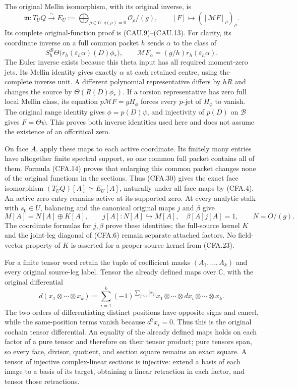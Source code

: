 The original Mellin isomorphism, with its original inverse, is
\[
 \mathfrak m:T_UQ\xrightarrow{\sim}
 E_U:=\bigoplus_{\rho\in U:g(\rho)=0}\mathcal O_\rho/(g),
 \qquad[F]\mapsto([\mathcal MF]_\rho)_\rho.                  \tag{CFA.30}
\]
Its complete original-function proof is (CAU.9)--(CAU.13).
For clarity, its coordinate inverse on a full common packet $h$
sends $\alpha$ to the class of
\[
 S_h^{\mathscr B}\Theta\bigl(r_h(\varepsilon_h\alpha)(D)\phi_*\bigr),
 \qquad\mathcal M F_\alpha=(g/h)r_h(\varepsilon_h\alpha).
                                                               \tag{CFA.31}
\]
The Euler inverse exists because this theta input has all required
moment-zero jets.  Its Mellin identity gives exactly $\alpha$ at
each retained centre, using the complete inverse unit.  A different
polynomial representative differs by $hR$ and changes the source
by $\Theta(R(D)\phi_*)$.  If a torsion representative has zero
full local Mellin class, its equation $p\mathcal MF=gH_\phi$
forces every $p$-jet of $H_\phi$ to vanish.  The original range
identity gives $\phi=p(D)\psi$, and injectivity of $p(D)$ on
$\mathscr B$ gives $F=\Theta\psi$.  This proves both inverse
identities used here and does not assume the existence of an offcritical
zero.

On face $A$, apply these maps to each active coordinate.  Its finitely
many entries have altogether finite spectral support, so one common
full packet contains all of them.  Formula (CFA.14) proves that enlarging
this common packet changes none of the original functions in the
sections.  Thus (CFA.30) gives the exact face isomorphism
$(T_UQ)[A]\simeq E_U[A]$, naturally under all face maps by (CFA.4).
An active zero entry remains active at its supported zero.
At every analytic stalk with $s_0\in U$, balancing and the canonical original maps
$j$ and $\beta$ give
\[
 M[A]=N[A]\oplus K[A],\qquad
 j[A]:N[A]\hookrightarrow M[A],\quad
 \beta[A]j[A]=1,\qquad N=O/(g).                              \tag{CFA.32}
\]
The coordinate formulas for $j,\beta$ prove these identities; the
full-source kernel $K$ and the joint-leg diagonal of (CFA.6) remain
separate attached factors.  No field-vector property of $K$ is
asserted for a proper-source kernel from (CFA.23).

For a finite tensor word retain the tuple of coefficient masks
$(A_1,\ldots,A_k)$ and every original source-leg label.  Tensor the
already defined maps over $\mathbb C$, with the original differential
\[
 d(x_1\otimes\cdots\otimes x_k)
 =\sum_{i=1}^k(-1)^{\sum_{j<i}|x_j|}
       x_1\otimes\cdots\otimes dx_i\otimes\cdots\otimes x_k.
                                                               \tag{CFA.33}
\]
The two orders of differentiating distinct positions have opposite
signs and cancel, while the same-position terms vanish because
$d^2x_i=0$.  Thus this is the original cochain tensor differential.
An equality of the already defined maps holds on each factor of a
pure tensor and therefore on their tensor product; pure tensors span,
so every face, divisor, quotient, and section square remains an exact
square.  A tensor of injective complex-linear sections is injective:
extend a basis of each image to a basis of its target, obtaining a
linear retraction in each factor, and tensor those retractions.

